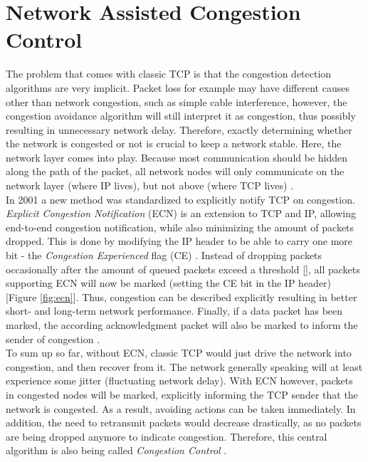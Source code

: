 \documentclass[a4paper,conference]{IEEEtran}
\begin{document}
\section{Network Assisted Congestion Control}
\label{sec:cc}
The problem that comes with classic TCP is that the congestion detection algorithms are very implicit. Packet loss for example may have different causes other than network congestion, such as simple cable interference, however, the congestion avoidance algorithm will still interpret it as congestion, thus possibly resulting in unnecessary network delay. Therefore, exactly determining whether the network is congested or not is crucial to keep a network stable. Here, the network layer comes into play. Because most communication should be hidden along the path of the packet, all network nodes will only communicate on the network layer (where IP lives), but not above (where TCP lives) \cite{ramakrishnan1999proposal}.\\
In 2001 a new method was standardized to explicitly notify TCP on congestion. \textit{Explicit Congestion Notification} (ECN) is an extension to TCP and IP, allowing end-to-end congestion notification, while also minimizing the amount of packets dropped. This is done by modifying the IP header to be able to carry one more bit - the \textit{Congestion Experienced} flag (CE) \cite{ramakrishnan1999proposal}. Instead of dropping packets occasionally after the amount of queued packets exceed a threshold [], all packets supporting ECN will now be marked (setting the CE bit in the IP header) [Figure \ref{fig:ecn}]. Thus, congestion can be described explicitly resulting in better short- and long-term network performance. Finally, if a data packet has been marked, the according acknowledgment packet will also be marked to inform the sender of congestion \cite{ramakrishnan1999proposal,ramakrishnan2001addition,10.1145/205511.205512}.\\
To sum up so far, without ECN, classic TCP would just drive the network into congestion, and then recover from it. The network generally speaking will at least experience some jitter (fluctuating network delay). With ECN however, packets in congested nodes will be marked, explicitly informing the TCP sender that the network is congested. As a result, avoiding actions can be taken immediately. In addition, the need to retransmit packets would decrease drastically, as no packets are being dropped anymore to indicate congestion. Therefore, this central algorithm is also being called \textit{Congestion Control} \cite{ramakrishnan1999proposal,ramakrishnan2001addition}.
\end{document}
